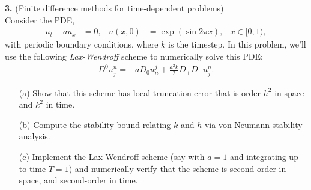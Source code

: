 \documentclass[11pt]{amsart}
\begin{document}
\noindent\textbf{3.} (Finite difference methods for time-dependent problems)\\
  Consider the PDE,
  \begin{align*}
    u_t + a u_x &= 0, & u(x,0) &= \exp(\sin 2 \pi x), & x \in [0, 1),
  \end{align*}
  with periodic boundary conditions, where $k$ is the timestep. In this problem, we'll use the following \textit{Lax-Wendroff} scheme to numerically solve this PDE:
  \begin{align*}
    D^0 u_j^n = -a D_0 u^j_n + \frac{a^2 k}{2} D_+ D_- u_j^n.
  \end{align*}
  \begin{itemize}
    \item[(a)] Show that this scheme has local truncation error that is order $h^2$ in space and $k^2$ in time.
    \item[(b)] Compute the stability bound relating $k$ and $h$ via von Neumann stability analysis.
    \item[(c)] Implement the Lax-Wendroff scheme (say with $a = 1$ and integrating up to time $T=1$) and numerically verify that the scheme is second-order in space, and second-order in time.
  \end{itemize}

%
%
\end{document}

